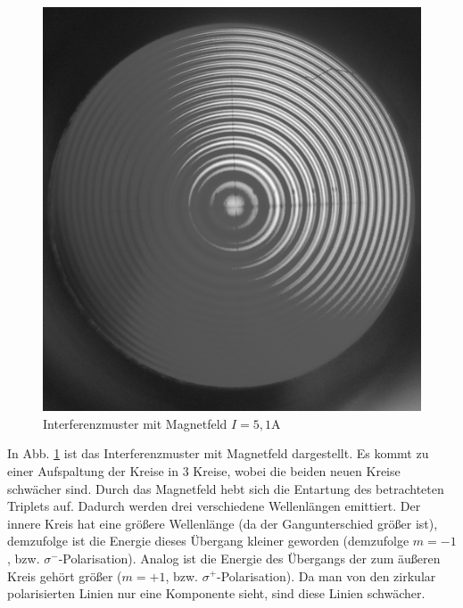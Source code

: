 \begin{figure}
\centering
\includegraphics[scale=0.1]{data/bilder_okular/bild_2_edit.jpg}
\caption{Interferenzmuster mit Magnetfeld $I=5,1\si{\ampere}$}
\label{fig:bildtransmitB}
\end{figure}
In Abb. \ref{fig:bildtransmitB} ist das Interferenzmuster mit Magnetfeld dargestellt. Es kommt zu einer Aufspaltung der Kreise in 3 Kreise, wobei die beiden neuen Kreise schwächer sind. Durch das Magnetfeld hebt sich die Entartung des betrachteten Triplets auf. Dadurch werden drei verschiedene Wellenlängen emittiert. Der innere Kreis hat eine größere Wellenlänge (da der Gangunterschied größer ist), demzufolge ist die Energie dieses Übergang kleiner geworden (demzufolge $m = -1$, bzw. $\sigma^-$-Polarisation). Analog ist die Energie des Übergangs der zum äußeren Kreis gehört größer ($m = +1$, bzw. $\sigma^+$-Polarisation). Da man von den zirkular polarisierten Linien nur eine Komponente sieht, sind diese Linien schwächer.\\

